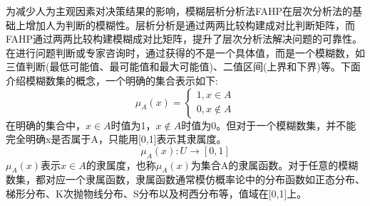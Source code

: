 为减少人为主观因素对决策结果的影响，模糊层析分析法FAHP在层次分析法的基础上增加人为判断的模糊性。层析分析是通过两两比较构建成对比判断矩阵，而FAHP通过两两比较构建模糊成对比矩阵，提升了层次分析法解决问题的可靠性。在进行问题判断或专家咨询时，通过获得的不是一个具体值，而是一个模糊数，如三值判断(最低可能值、最可能值和最大可能值)、二值区间(上界和下界)等。下面介绍模糊数集的概念，一个明确的集合表示如下:
\begin{equation}
\mu_{A}(x) = \left\{\begin{array}{l}
1, x\in A \\ [0.3cm]
0, x\notin A
\end{array}\right.
\end{equation}
在明确的集合中，$x\in A$时值为1，$x\notin A$时值为0。但对于一个模糊数集，并不能完全明确x是否属于A，只能用[0,1]表示其隶属度。
\begin{equation}
\mu_{A}(x):U\to[0,1]
\end{equation}
\begin{math}\mu_{A}(x)\end{math}表示\begin{math}x\in A\end{math}的隶属度，也称\begin{math}\mu_{A}(x)\end{math}为集合A的隶属函数。对于任意的模糊数集，都对应一个隶属函数，隶属函数通常模仿概率论中的分布函数如正态分布、梯形分布、K次抛物线分布、S分布以及柯西分布等，值域在[0,1]上。

